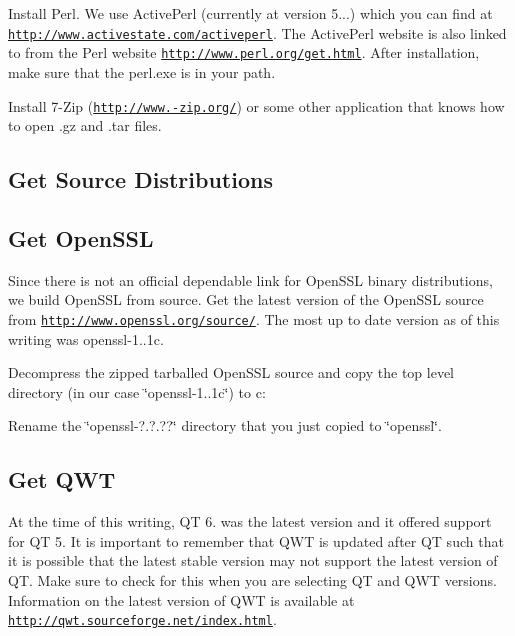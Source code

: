 \begin{DoxyEnumerate}
\item Install Perl. We use Active\-Perl (currently at version 5...) which you can find at \href{http://www.activestate.com/activeperl}{\tt http\-://www.\-activestate.\-com/activeperl}. The Active\-Perl website is also linked to from the Perl website \href{http://www.perl.org/get.html}{\tt http\-://www.\-perl.\-org/get.\-html}. After installation, make sure that the perl.\-exe is in your path.
\item Install 7-\/\-Zip (\href{http://www.7-zip.org/}{\tt http\-://www.-\/zip.\-org/}) or some other application that knows how to open .gz and .tar files.
\end{DoxyEnumerate}\hypertarget{build_environment_preparation_get_source_dist}{}\subsection{Get Source Distributions}\label{build_environment_preparation_get_source_dist}
\hypertarget{build_environment_preparation_get_openssl}{}\subsection{Get Open\-S\-S\-L}\label{build_environment_preparation_get_openssl}

\begin{DoxyEnumerate}
\item Since there is not an official dependable link for Open\-S\-S\-L binary distributions, we build Open\-S\-S\-L from source. Get the latest version of the Open\-S\-S\-L source from \href{http://www.openssl.org/source/}{\tt http\-://www.\-openssl.\-org/source/}. The most up to date version as of this writing was openssl-\/1..\-1c.
\item Decompress the zipped tarballed Open\-S\-S\-L source and copy the top level directory (in our case \char`\"{}openssl-\/1..\-1c\char`\"{}) to c\-:
\item Rename the \char`\"{}openssl-\/?.?.??\char`\"{} directory that you just copied to \char`\"{}openssl\char`\"{}.
\end{DoxyEnumerate}\hypertarget{build_environment_preparation_get_qwt}{}\subsection{Get Q\-W\-T}\label{build_environment_preparation_get_qwt}
At the time of this writing, Q\-T 6. was the latest version and it offered support for Q\-T 5. It is important to remember that Q\-W\-T is updated after Q\-T such that it is possible that the latest stable version may not support the latest version of Q\-T. Make sure to check for this when you are selecting Q\-T and Q\-W\-T versions. Information on the latest version of Q\-W\-T is available at \href{http://qwt.sourceforge.net/index.html}{\tt http\-://qwt.\-sourceforge.\-net/index.\-html}.


